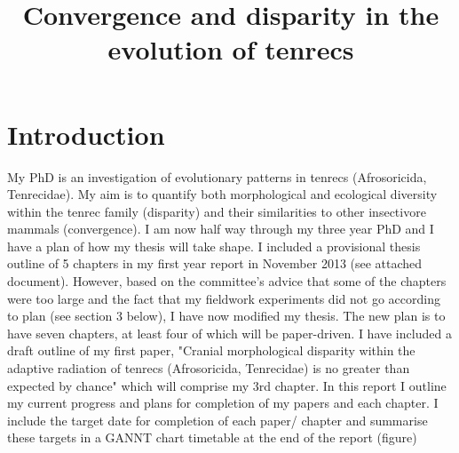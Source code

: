 \documentclass[12pt,a4paper]{article}
\begin{document}
\title{Convergence and disparity in the evolution of tenrecs}
\author{}
\date{}
\maketitle


\renewcommand{\headrulewidth}{0.0pt}
\thispagestyle{fancy}				%
\chead{}


\section{Introduction}
My PhD is an investigation of evolutionary patterns in tenrecs (Afrosoricida, Tenrecidae). My aim is to quantify both morphological and ecological diversity within the tenrec family (disparity) and their similarities to other insectivore mammals (convergence). 
I am now half way through my three year PhD and I have a plan of how my thesis will take shape. I included a provisional thesis outline of 5 chapters in my first year report in November 2013 (see attached document). However, based on the committee's advice that some of the chapters were too large and the fact that my fieldwork experiments did not go according to plan (see section 3 below), I have now modified my thesis.  The new plan is to have seven chapters, at least four of which will be paper-driven. I have included a draft outline of my first paper, "Cranial morphological disparity within the adaptive radiation of tenrecs (Afrosoricida, Tenrecidae) is no greater than expected by chance" which will comprise my 3rd chapter.
In this report I outline my current progress and plans for completion of my papers and each chapter. I include the target date for completion of each paper/ chapter and summarise these targets in a GANNT chart timetable at the end of the report (figure) %

\newpage
\end{document}
